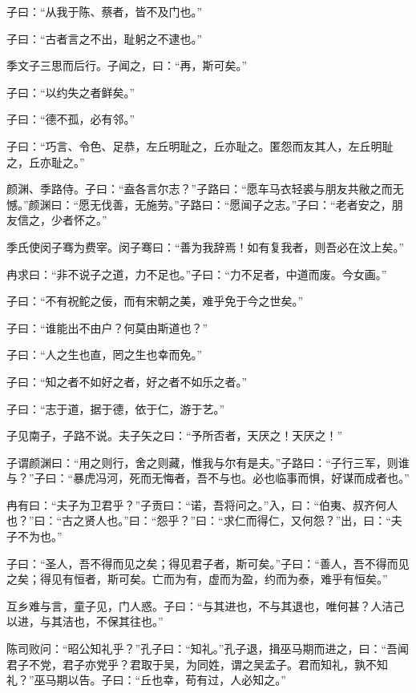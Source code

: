 \documentclass[a5paper]{ctexbook}
\begin{document}
    子曰：“从我于陈、蔡者，皆不及门也。”

    子曰：“古者言之不出，耻躬之不逮也。”

    季文子三思而后行。子闻之，曰：“再，斯可矣。”
    
    子曰：“以约失之者鲜矣。”

    子曰：“德不孤，必有邻。”

    子曰：“巧言、令色、足恭，左丘明耻之，丘亦耻之。匿怨而友其人，左丘明耻之，丘亦耻之。”

    颜渊、季路侍。子曰：“盍各言尔志？”子路曰：“愿车马衣轻裘与朋友共敝之而无憾。”颜渊曰：“愿无伐善，无施劳。”子路曰：“愿闻子之志。”子曰：“老者安之，朋友信之，少者怀之。”

    

    季氏使闵子骞为费宰。闵子骞曰：“善为我辞焉！如有复我者，则吾必在汶上矣。”

    冉求曰：“非不说子之道，力不足也。”子曰：“力不足者，中道而废。今女画。”

    子曰：“不有祝𬶍之佞，而有宋朝之美，难乎免于今之世矣。”

    子曰：“谁能出不由户？何莫由斯道也？”

    子曰：“人之生也直，罔之生也幸而免。”

    子曰：“知之者不如好之者，好之者不如乐之者。”

    

    子曰：“志于道，据于德，依于仁，游于艺。”

    

    子见南子，子路不说。夫子矢之曰：“予所否者，天厌之！天厌之！”

    子谓颜渊曰：“用之则行，舍之则藏，惟我与尔有是夫。”子路曰：“子行三军，则谁与？”子曰：“暴虎冯河，死而无悔者，吾不与也。必也临事而惧，好谋而成者也。”

    冉有曰：“夫子为卫君乎？”子贡曰：“诺，吾将问之。”入，曰：“伯夷、叔齐何人也？”曰：“古之贤人也。”曰：“怨乎？”曰：“求仁而得仁，又何怨？”出，曰：“夫子不为也。”

    子曰：“圣人，吾不得而见之矣；得见君子者，斯可矣。”子曰：“善人，吾不得而见之矣；得见有恒者，斯可矣。亡而为有，虚而为盈，约而为泰，难乎有恒矣。”

    互乡难与言，童子见，门人惑。子曰：“与其进也，不与其退也，唯何甚？人洁己以进，与其洁也，不保其往也。”

    陈司败问：“昭公知礼乎？”孔子曰：“知礼。”孔子退，揖巫马期而进之，曰：“吾闻君子不党，君子亦党乎？君取于吴，为同姓，谓之吴孟子。君而知礼，孰不知礼？”巫马期以告。子曰：“丘也幸，苟有过，人必知之。”
\end{document}
